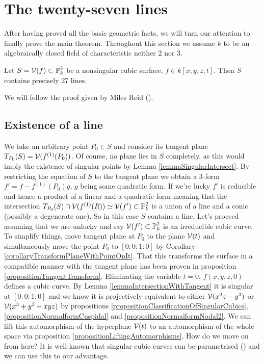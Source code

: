 \section{The twenty-seven lines}

After having proved all the basic geometric facts, we will turn our attention to finally prove the main theorem. Throughout this section we assume $k$ to be an algebraically closed field of characteristic neither 2 nor 3.
\begin{theorem}
Let $S = \operatorname{\mathcal V}(f) \subset \operatorname{\mathbb P}^3_k$ be a nonsingular cubic surface, $f\in k[x,y,z,t]$.
Then $S$ contains precisely 27 lines.
\end{theorem}
We will follow the proof given by Miles Reid (\cite[§7]{reid1988undergraduate}).

\subsection{Existence of a line}

We take an arbitrary point $P_0 \in S$ and consider its tangent plane $T_{P_0}(S) = \operatorname{\mathcal V}(f^{(1)}(P_0))$.
Of course, no plane lies in $S$ completely, as this would imply the existence of singular points by Lemma \ref{lemmaSingularIntersect}.
By restricting the equation of $S$ to the tangent plane we obtain a 3-form $f' = f - f^{(1)}(P_0)g$, $g$ being some quadratic form.
If we're lucky $f'$ is reducible and hence a product of a linear and a quadratic form meaning that the intersection $T_{P_0}(S) \cap \operatorname{\mathcal V}(f^{(1)}(R)) \simeq \operatorname{\mathcal V}(f') \subset \operatorname{\mathbb P}^2_k$ is a union of a line and a conic (possibly a degenerate one).
So in this case $S$ contains a line.
Let's proceed assuming that we are unlucky and say $\operatorname{\mathcal V}(f') \subset \operatorname{\mathbb P}^2_k$ is an irreducible cubic curve.
To simplify things, move tangent plane at $P_0$ to the plane $\operatorname{\mathcal V}(t)$ and simultaneously move the point $P_0$ to $[0:0:1:0]$ by Corollary \ref{corollaryTransformPlaneWithPointOnIt}.
That this transforms the surface in a compatible manner with the tangent plane has been proven in proposition \ref{propositionTangentTransform}.
Eliminating the variable $t = 0$, $f(x,y,z,0)$ defines a cubic curve.
By Lemma \ref{lemmaIntersectionWithTangent} it is singular at $[0:0:1:0]$ and we know it is projectively equivalent to either $\operatorname{\mathcal V}(x^2z - y^3)$ or $\operatorname{\mathcal V}(x^3 + y^3 - xyz)$ by propositions \ref{propositionClassificationOfSingularCubics}, \ref{propositionNormalformCuspidal} and \ref{propositionNormalformNodal2}.
We can lift this automorphism of the hyperplane $\operatorname{\mathcal V}(t)$ to an automorphism of the whole space via proposition \ref{propositionLiftingAutomorphisms}.
How do we move on from here?
It is well-known that singular cubic curves can be parametrised (\cite[chapter 1.1.2]{shafarevich1994basic}) and we can use this to our advantage.

